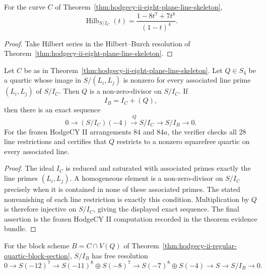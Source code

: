 \begin{corollary}\label{cor:hodgecy-ii-line-skeleton-hilbert-series}
For the curve \(C\) of Theorem~\ref{thm:hodgecy-ii-eight-plane-line-skeleton},
\[
  \operatorname{Hilb}_{S/I_C}(t)
  =
  \frac{1-8t^7+7t^8}{(1-t)^4}.
\]
\end{corollary}

\begin{proof}
Take Hilbert series in the Hilbert--Burch resolution of
Theorem~\ref{thm:hodgecy-ii-eight-plane-line-skeleton}.
\end{proof}

\begin{theorem}\label{thm:hodgecy-ii-regular-quartic-block-section}
Let \(C\) be as in Theorem~\ref{thm:hodgecy-ii-eight-plane-line-skeleton}.
Let \(Q\in S_4\) be a quartic whose image in \(S/(L_i,L_j)\) is nonzero
for every associated line prime \((L_i,L_j)\) of \(S/I_C\).  Then \(Q\)
is a non-zero-divisor on \(S/I_C\).  If
\[
  I_B=I_C+(Q),
\]
then there is an exact sequence
\[
  0 \longrightarrow (S/I_C)(-4)
  \xrightarrow{\cdot Q}
  S/I_C
  \longrightarrow S/I_B
  \longrightarrow 0.
\]
For the frozen HodgeCY II arrangements \(84\) and \(84a\), the verifier
checks all \(28\) line restrictions and certifies that \(Q\) restricts
to a nonzero squarefree quartic on every associated line.
\end{theorem}

\begin{proof}
The ideal \(I_C\) is reduced and saturated with associated primes
exactly the line primes \((L_i,L_j)\).  A homogeneous element is a
non-zero-divisor on \(S/I_C\) precisely when it is contained in none of
these associated primes.  The stated nonvanishing of each line
restriction is exactly this condition.  Multiplication by \(Q\) is
therefore injective on \(S/I_C\), giving the displayed exact sequence.
The final assertion is the frozen HodgeCY II computation recorded in
the theorem evidence bundle.
\end{proof}

\begin{corollary}\label{cor:hodgecy-ii-block-mapping-cone}
For the block scheme \(B=C\cap V(Q)\) of
Theorem~\ref{thm:hodgecy-ii-regular-quartic-block-section}, \(S/I_B\)
has free resolution
\[
0
\longrightarrow S(-12)^7
\longrightarrow S(-11)^8 \oplus S(-8)^7
\longrightarrow S(-7)^8 \oplus S(-4)
\longrightarrow S
\longrightarrow S/I_B
\longrightarrow 0.
\]
\end{corollary}

